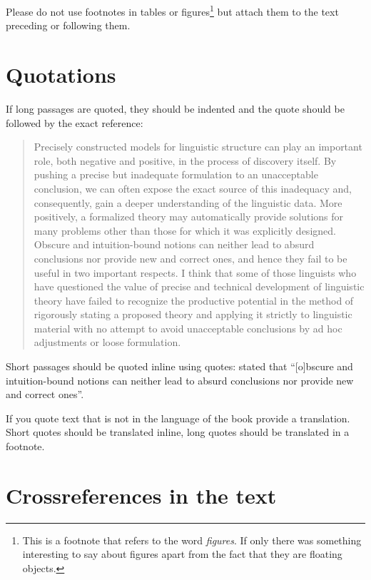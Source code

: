 Please do not use footnotes in tables or figures\footnote{
  This is a footnote that refers to the word \emph{figures}. If only there was something interesting
  to say about figures apart from the fact that they are floating objects.
} but attach them to the text preceding or following them.



\section{Quotations}

If long passages are quoted, they should be indented and the quote should be followed by the exact reference:
\begin{quotation}
Precisely constructed models for linguistic structure can play an
important role, both negative and positive, in the process of discovery 
itself. By pushing a precise but inadequate formulation to
an unacceptable conclusion, we can often expose the exact source
of this inadequacy and, consequently, gain a deeper understanding
of the linguistic data. More positively, a formalized theory may 
automatically provide solutions for many problems other than those
for which it was explicitly designed. Obscure and intuition-bound
notions can neither lead to absurd conclusions nor provide new and
correct ones, and hence they fail to be useful in two important respects. 
I think that some of those linguists who have questioned
the value of precise and technical development of linguistic theory
have failed to recognize the productive potential in the method
of rigorously stating a proposed theory and applying it strictly to
linguistic material with no attempt to avoid unacceptable conclusions 
by ad hoc adjustments or loose formulation.
\citep[5]{Chomsky57a}
\end{quotation}
%
Short passages should be quoted inline using quotes: \citet[5]{Chomsky57a} stated that ``[o]bscure
  and intuition-bound notions can neither lead to absurd conclusions nor provide new and
correct ones''.

If you quote text that is not in the language of the book provide a translation. Short quotes should
be translated inline, long quotes should be translated in a footnote.

\section{Crossreferences in the text}

